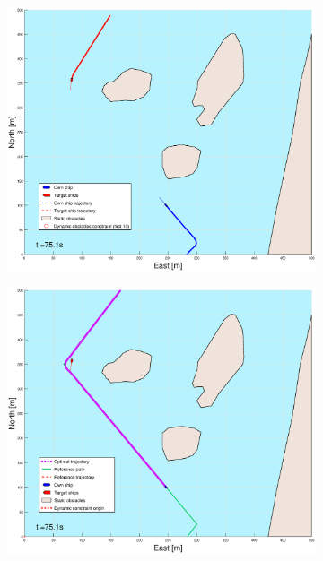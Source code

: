 \begin{figure}[!b]
\begin{subfigure}[b]{0.499\textwidth}
    \end{subfigure}
    \hfill
    \\
    \begin{subfigure}[b]{0.49\textwidth}
        \centering
        \includegraphics[width=\textwidth]{Images/Figures/Helloya/_Simple_1fig1_time=75}
    \end{subfigure}
    \hfill
    \begin{subfigure}[b]{0.499\textwidth}
        \centering
        \includegraphics[width=\textwidth]{Images/Figures/Helloya/_Simple_1fig999_time=75}
    \end{subfigure}
    \hfill
\end{figure}%
